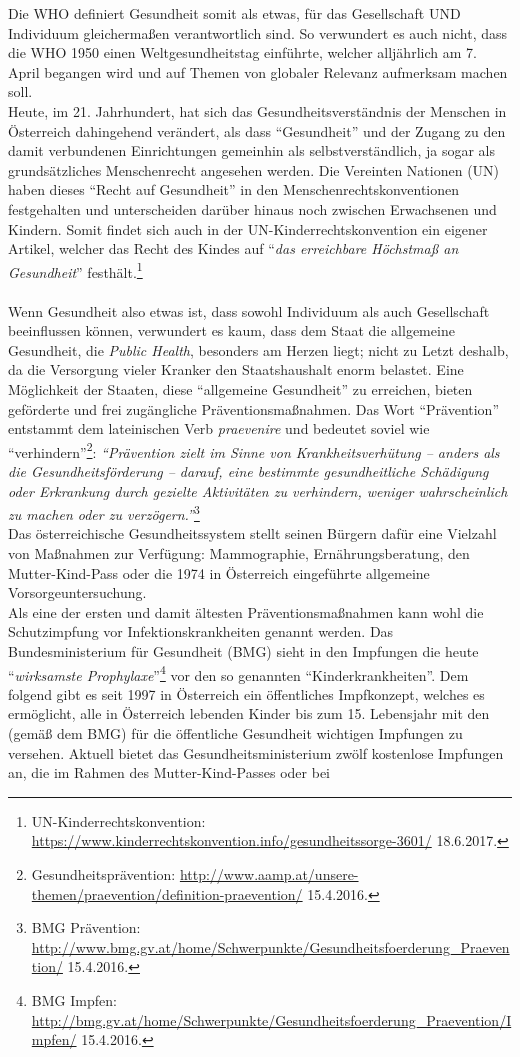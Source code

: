 \documentclass[
    a4paper,
    12pt,
    hyphens,
    chapterprefix=true,
    headheight=33pt,
    footheight=29pt,
    headings=optiontohead, %
]{scrartcl}
\begin{document}
Die WHO definiert Gesundheit somit als etwas, für das Gesellschaft UND Individuum gleichermaßen verantwortlich sind. So verwundert es auch nicht, dass die WHO 1950 einen Weltgesundheitstag einführte, welcher alljährlich am 7. April begangen wird und auf Themen von globaler Relevanz aufmerksam machen soll.\\
Heute, im 21. Jahrhundert, hat sich das Gesundheitsverständnis der Menschen in Österreich dahingehend verändert, als dass "`Gesundheit"' und der Zugang zu den damit verbundenen Einrichtungen gemeinhin als selbstverständlich, ja sogar als grundsätzliches Menschenrecht angesehen werden. Die Vereinten Nationen (UN) haben dieses "`Recht auf Gesundheit"' in den Menschenrechtskonventionen festgehalten und unterscheiden darüber hinaus noch zwischen Erwachsenen und Kindern. Somit findet sich auch in der UN-Kinderrechtskonvention ein eigener Artikel, welcher das Recht des Kindes auf "`\textit{das erreichbare Höchstmaß an Gesundheit}"' festhält.\footnote{UN-Kinderrechtskonvention: \url{https://www.kinderrechtskonvention.info/gesundheitssorge-3601/} 18.6.2017.}\\
\\
Wenn Gesundheit also etwas ist, dass sowohl Individuum als auch Gesellschaft beeinflussen können, verwundert es kaum, dass dem Staat die allgemeine Gesundheit, die \textit{Public Health}, besonders am Herzen liegt; nicht zu Letzt deshalb, da die Versorgung vieler Kranker den Staatshaushalt enorm belastet. Eine Möglichkeit der Staaten, diese "`allgemeine Gesundheit"' zu erreichen, bieten geförderte und frei zugängliche Präventionsmaßnahmen. Das Wort "`Prävention"' entstammt dem lateinischen Verb \textit{praevenire} und bedeutet soviel wie "`verhindern"'\footnote{Gesundheitsprävention: \url{http://www.aamp.at/unsere-themen/praevention/definition-praevention/} 15.4.2016.}: \textit{"`Prävention zielt im Sinne von Krankheitsverhütung
-- anders als die Gesundheitsförderung -- darauf, eine bestimmte gesundheitliche Schädigung oder Erkrankung durch gezielte Aktivitäten zu verhindern, weniger wahrscheinlich zu machen oder zu verzögern."'}\footnote{BMG Prävention: \url{http://www.bmg.gv.at/home/Schwerpunkte/Gesundheitsfoerderung\_Praevention/} 15.4.2016.}\\
Das österreichische Gesundheitssystem stellt seinen Bürgern dafür eine Vielzahl von Maßnahmen zur Verfügung: Mammographie, Ernährungsberatung, den Mutter-Kind-Pass oder die 1974 in Österreich eingeführte allgemeine Vorsorgeuntersuchung.\\
Als eine der ersten und damit ältesten Präventionsmaßnahmen kann wohl die Schutzimpfung vor Infektionskrankheiten genannt werden. Das Bundesministerium für Gesundheit (BMG) sieht in den Impfungen die heute "`\textit{wirksamste Prophylaxe}"'\footnote{BMG Impfen: \url{http://bmg.gv.at/home/Schwerpunkte/Gesundheitsfoerderung\_Praevention/Impfen/} 15.4.2016.} vor den so genannten "`Kinderkrankheiten"'. Dem folgend gibt es seit 1997 in Österreich ein öffentliches Impfkonzept, welches es ermöglicht, alle in Österreich lebenden Kinder bis zum 15. Lebensjahr mit den (gemäß dem BMG) für die öffentliche Gesundheit wichtigen Impfungen zu versehen. Aktuell bietet das Gesundheitsministerium zwölf kostenlose Impfungen an, die im Rahmen des Mutter-Kind-Passes oder bei 
\end{document}
